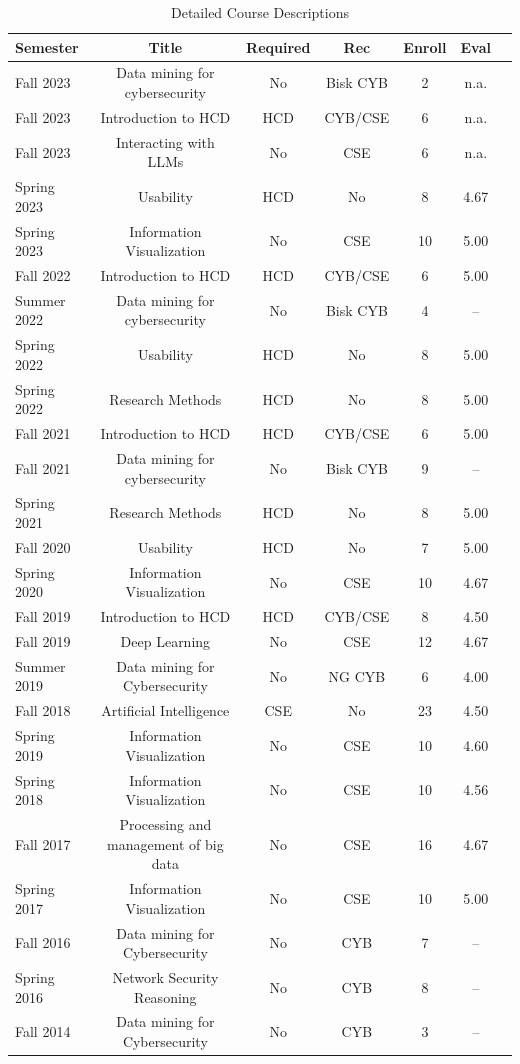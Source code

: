 \documentclass[12pt,letterpaper]{report}
\begin{document}
\begin{table}
\caption{Detailed Course Descriptions}
\label{details}
\center
\begin{tabular}{| l | c | c | c | c | c | c |}
Semester & Title & Required & Rec & Enroll & Eval \\ \hline
Fall 2023 & Data mining for cybersecurity & No & Bisk CYB  & 2 & n.a. \\
Fall 2023 & Introduction to HCD & HCD & CYB/CSE  & 6 & n.a. \\
Fall 2023 & Interacting with LLMs & No & CSE  & 6 & n.a. \\
Spring 2023 & Usability & HCD & No  & 8 & 4.67 \\
Spring 2023 & Information Visualization & No & CSE  & 10 & 5.00 \\
Fall 2022 & Introduction to HCD & HCD & CYB/CSE  & 6 & 5.00 \\
Summer 2022 & Data mining for cybersecurity & No & Bisk CYB  & 4 & -- \\
Spring 2022 & Usability & HCD & No  & 8 & 5.00 \\
Spring 2022 & Research Methods & HCD & No  & 8 & 5.00 \\
Fall 2021 & Introduction to HCD & HCD & CYB/CSE  & 6 & 5.00 \\
Fall 2021 & Data mining for cybersecurity & No & Bisk CYB  & 9 & -- \\
Spring 2021 & Research Methods & HCD & No  & 8 & 5.00 \\
Fall 2020 & Usability & HCD & No   & 7 & 5.00 \\
Spring 2020 & Information Visualization & No & CSE  & 10 & 4.67 \\
Fall 2019 & Introduction to HCD & HCD & CYB/CSE  & 8 & 4.50 \\
Fall 2019 & Deep Learning & No & CSE & 12 & 4.67 \\ 
Summer 2019 & Data mining for Cybersecurity & No & NG CYB  & 6 & 4.00 \\
Fall 2018 & Artificial Intelligence & CSE & No  &  23 & 4.50 \\
Spring 2019 & Information Visualization & No & CSE  & 10 & 4.60 \\
Spring 2018 & Information Visualization & No & CSE  & 10 & 4.56 \\
Fall 2017 & Processing and management of big data & No & CSE & 16 & 4.67 \\
Spring 2017 & Information Visualization & No & CSE  & 10 & 5.00 \\
Fall 2016 &  Data mining for Cybersecurity & No & CYB  & 7 & -- \\
Spring 2016 & Network Security Reasoning & No & CYB & 8 & -- \\
Fall 2014 & Data mining for Cybersecurity & No & CYB  & 3 & -- \\
\end{tabular}
\end{table}
\end{document}
